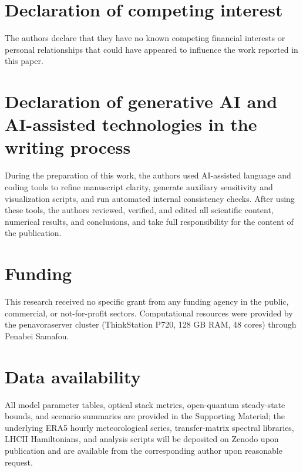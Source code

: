 \documentclass[preprint,12pt,a4paper]{elsarticle}
\begin{document}
\section*{Declaration of competing interest}
The authors declare that they have no known competing financial interests or personal relationships that could have appeared to influence the work reported in this paper.

\section*{Declaration of generative AI and AI-assisted technologies in the writing process}
During the preparation of this work, the authors used AI-assisted language and coding tools to refine manuscript clarity, generate auxiliary sensitivity and visualization scripts, and run automated internal consistency checks. After using these tools, the authors reviewed, verified, and edited all scientific content, numerical results, and conclusions, and take full responsibility for the content of the publication.

\section*{Funding}
This research received no specific grant from any funding agency in the public, commercial, or not-for-profit sectors. Computational resources were provided by the penavoraserver cluster (ThinkStation P720, 128 GB RAM, 48 cores) through Penabei Samafou.

\section*{Data availability}
All model parameter tables, optical stack metrics, open-quantum steady-state bounds, and scenario summaries are provided in the Supporting Material; the underlying ERA5 hourly meteorological series, transfer-matrix spectral libraries, LHCII Hamiltonians, and analysis scripts will be deposited on Zenodo upon publication and are available from the corresponding author upon reasonable request.



\end{document}
